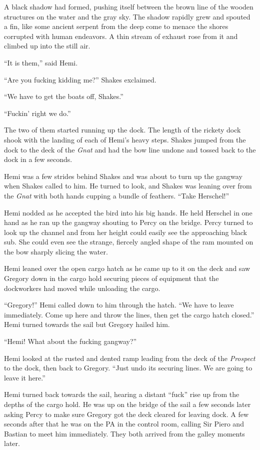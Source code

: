 \documentclass[
]{scrbook}
\begin{document}
A black shadow had formed, pushing itself between the brown line of the
wooden structures on the water and the gray sky. The shadow rapidly grew
and spouted a fin, like some ancient serpent from the deep come to
menace the shores corrupted with human endeavors. A thin stream of
exhaust rose from it and climbed up into the still air.

``It is them,'' said Hemi.

``Are you fucking kidding me?'' Shakes exclaimed.

``We have to get the boats off, Shakes.''

``Fuckin' right we do.''

The two of them started running up the dock. The length of the rickety
dock shook with the landing of each of Hemi's heavy steps. Shakes jumped
from the dock to the deck of the \emph{Gnat} and had the bow line undone
and tossed back to the dock in a few seconds.

Hemi was a few strides behind Shakes and was about to turn up the
gangway when Shakes called to him. He turned to look, and Shakes was
leaning over from the \emph{Gnat} with both hands cupping a bundle of
feathers. ``Take Herschel!''

Hemi nodded as he accepted the bird into his big hands. He held Herschel
in one hand as he ran up the gangway shouting to Percy on the bridge.
Percy turned to look up the channel and from her height could easily see
the approaching black sub. She could even see the strange, fiercely
angled shape of the ram mounted on the bow sharply slicing the water.

Hemi leaned over the open cargo hatch as he came up to it on the deck
and saw Gregory down in the cargo hold securing pieces of equipment that
the dockworkers had moved while unloading the cargo.

``Gregory!'' Hemi called down to him through the hatch. ``We have to
leave immediately. Come up here and throw the lines, then get the cargo
hatch closed.'' Hemi turned towards the sail but Gregory hailed him.

``Hemi! What about the fucking gangway?''

Hemi looked at the rusted and dented ramp leading from the deck of the
\emph{Prospect} to the dock, then back to Gregory. ``Just undo its
securing lines. We are going to leave it here.''

Hemi turned back towards the sail, hearing a distant ``fuck'' rise up
from the depths of the cargo hold. He was up on the bridge of the sail a
few seconds later asking Percy to make sure Gregory got the deck cleared
for leaving dock. A few seconds after that he was on the PA in the
control room, calling Sir Piero and Bastian to meet him immediately.
They both arrived from the galley moments later.
\end{document}
